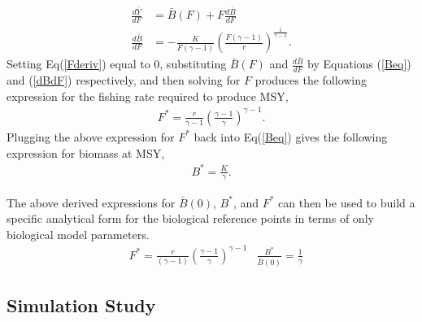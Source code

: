 \documentclass[12pt]{article}
\begin{document}
%
\begin{align}
\frac{d \bar{Y}}{dF} &= \bar B(F) + F \frac{d \bar B}{dF} \label{Fderiv}\\
\frac{d \bar B}{dF} &= -\frac{K}{F(\gamma-1)}\left(\frac{F(\gamma-1)}{r}\right)^{\frac{1}{\gamma-1}}\label{dBdF}.
\end{align}
Setting Eq(\ref{Fderiv}) equal to 0, substituting $\bar B(F)$ and 
$\frac{d \bar B}{dF}$ by Equations (\ref{Beq}) and (\ref{dBdF}) respectively, 
and then solving for $F$ produces the following expression for the fishing 
rate required to produce MSY, %
%
\begin{align}
F^* = \frac{r}{\gamma-1} \left(\frac{\gamma-1}{\gamma}\right)^{\gamma-1}. \label{Fmsy}
\end{align}
%
Plugging the above expression for $F^*$ back into Eq(\ref{Beq}) gives the 
following expression for biomass at MSY, 
\begin{align}
B^* = \frac{K}{\gamma} \label{Bmsy}. %
\end{align}

%
The above derived expressions for $\bar B(0)$, $B^*$, and $F^*$ can then be used to 
build a specific analytical form for the biological reference points in terms of only 
biological model parameters.
\begin{align}
&F^* = \frac{r}{(\gamma-1)} \left(\frac{\gamma-1}{\gamma}\right)^{\gamma-1}
&\frac{B^*}{\bar B(0)} = \frac{1}{\gamma} %
\end{align}


\subsection{Simulation Study \label{sim}}
\end{document}

